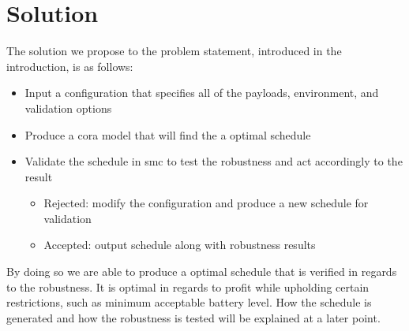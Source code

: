 \section{Solution} \label{sec:solution}
The solution we propose to the problem statement, introduced in the introduction, is as follows:
\begin{itemize}
	\item	Input a configuration that specifies all of the payloads, environment, and validation options
	\item	Produce a \gls{cora} model that will find the a optimal schedule
	\item	Validate the schedule in \gls{smc} to test the robustness and act accordingly to the result
	\begin{itemize}
		\item	Rejected: modify the configuration and produce a new schedule for validation
		\item	Accepted: output schedule along with robustness results
	\end{itemize}
\end{itemize}

By doing so we are able to produce a optimal schedule that is verified in regards to the robustness.
It is optimal in regards to profit while upholding certain restrictions, such as minimum acceptable battery level.
How the schedule is generated and how the robustness is tested will be explained at a later point.
